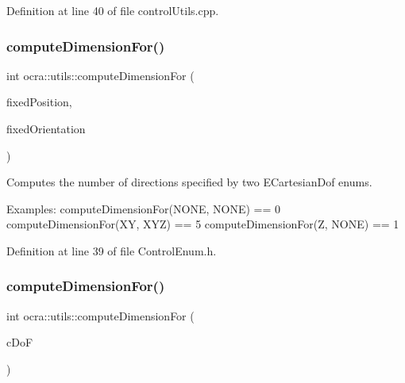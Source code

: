 Definition at line 40 of file control\+Utils.\+cpp.

\hypertarget{namespaceocra_1_1utils_abf6a0e8241cd263067cbf1c434952a01}{}\label{namespaceocra_1_1utils_abf6a0e8241cd263067cbf1c434952a01} 
\subsubsection{\texorpdfstring{compute\+Dimension\+For()}{computeDimensionFor()}\hspace{0.1cm}{\footnotesize\ttfamily [1/2]}}
{\footnotesize\ttfamily int ocra\+::utils\+::compute\+Dimension\+For (\begin{DoxyParamCaption}\item[{\hyperlink{namespaceocra_a436781c7059a0f76027df1c652126260}{E\+Cartesian\+Dof}}]{fixed\+Position,  }\item[{\hyperlink{namespaceocra_a436781c7059a0f76027df1c652126260}{E\+Cartesian\+Dof}}]{fixed\+Orientation }\end{DoxyParamCaption})\hspace{0.3cm}{\ttfamily [inline]}}



Computes the number of directions specified by two E\+Cartesian\+Dof enums. 

Examples\+: compute\+Dimension\+For(\+N\+O\+N\+E, N\+O\+N\+E) == 0 compute\+Dimension\+For(\+X\+Y, X\+Y\+Z) == 5 compute\+Dimension\+For(\+Z, N\+O\+N\+E) == 1 

Definition at line 39 of file Control\+Enum.\+h.

\hypertarget{namespaceocra_1_1utils_a27a97693df87c348850488eb7aeed12a}{}\label{namespaceocra_1_1utils_a27a97693df87c348850488eb7aeed12a} 
\subsubsection{\texorpdfstring{compute\+Dimension\+For()}{computeDimensionFor()}\hspace{0.1cm}{\footnotesize\ttfamily [2/2]}}
{\footnotesize\ttfamily int ocra\+::utils\+::compute\+Dimension\+For (\begin{DoxyParamCaption}\item[{\hyperlink{namespaceocra_a436781c7059a0f76027df1c652126260}{E\+Cartesian\+Dof}}]{c\+DoF }\end{DoxyParamCaption})\hspace{0.3cm}{\ttfamily [inline]}}



